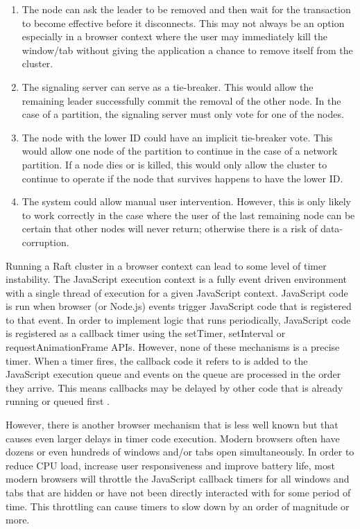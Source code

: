 \documentclass[9pt]{extarticle}
\begin{document}
\begin{multicols}{2}
\begin{enumerate}
\item The node can ask the leader to be removed and then wait for the
  transaction to become effective before it disconnects.  This may not
  always be an option especially in a browser context where the user
  may immediately kill the window/tab without giving the application
  a chance to remove itself from the cluster.
\item The signaling server can serve as a tie-breaker. This would allow
  the remaining leader successfully commit the removal of the other
  node. In the case of a partition, the signaling server must only
  vote for one of the nodes.
\item The node with the lower ID could have an implicit tie-breaker vote.
  This would allow one node of the partition to continue in the case
  of a network partition. If a node dies or is killed, this would only
  allow the cluster to continue to operate if the node that survives
  happens to have the lower ID.
\item The system could allow manual user intervention. However, this is
  only likely to work correctly in the case where the user of the last
  remaining node can be certain that other nodes will never return;
  otherwise there is a risk of data-corruption.
\end{enumerate}

Running a Raft cluster in a browser context can lead to some level of
timer instability. The JavaScript execution context is a fully event
driven environment with a single thread of execution for a given
JavaScript context. JavaScript code is run when browser (or Node.js)
events trigger JavaScript code that is registered to that event. In
order to implement logic that runs periodically, JavaScript code is
registered as a callback timer using the setTimer, setInterval or
requestAnimationFrame APIs. However, none of these mechanisms is
a precise timer. When a timer fires, the callback code it refers to
is added to the JavaScript execution queue and events on the queue are
processed in the order they arrive. This means callbacks may be
delayed by other code that is already running or queued first
\cite{resig2013secrets}.

However, there is another browser mechanism that is less well known
but that causes even larger delays in timer code execution. Modern
browsers often have dozens or even hundreds of windows and/or tabs
open simultaneously. In order to reduce CPU load, increase user
responsiveness and improve battery life, most modern browsers will
throttle the JavaScript callback timers for all windows and tabs that
are hidden or have not been directly interacted with for some period
of time. This throttling can cause timers to slow down by an order of
magnitude or more. %


\end{multicols}
\end{document}
